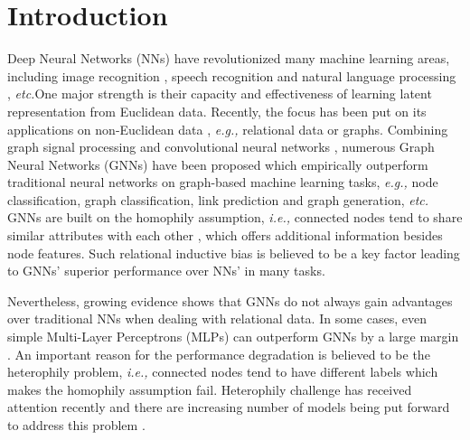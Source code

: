 \documentclass{article}
\newcommand\ie{\textit{i.e.,}}
\newcommand\eg{\textit{e.g.,}}
\newcommand\etc{\textit{etc.}}
\newcommand{\0}{{\boldsymbol{0}}}
\newcommand{\6}{{\partial}}
\newcommand{\8}{{\infty}}
\newcommand{\4}{{\nabla}}
\begin{document}
\section{Introduction}
\label{sec:introduction}
Deep Neural Networks (NNs) \cite{lecun2015deep} have revolutionized many machine learning areas, including image recognition \cite{krizhevsky2012imagenet}, speech recognition \cite{graves2013speech} and natural language processing \cite{bahdanau2014neural}, \etc  One major strength is their capacity and effectiveness of learning latent representation from Euclidean data. Recently, the focus has been put on its applications on non-Euclidean data \cite{bronstein2016geometric}, \eg{} relational data or graphs. Combining graph signal processing and convolutional neural networks \cite{lecun1998gradient}, numerous Graph Neural Networks (GNNs) \cite{scarselli2008graph,defferrard2016fast,hamilton2017inductive,velivckovic2017attention,kipf2016classification,luan2019break} have been proposed which empirically outperform traditional neural networks on graph-based machine learning tasks, \eg{} node classification, graph classification, link prediction and graph generation, \etc
GNNs are built on the homophily assumption\cite{mcpherson2001birds}, \ie{} connected nodes tend to share similar attributes with each other \cite{hamilton2020graph}, which offers additional information besides node features. Such relational inductive bias \cite{battaglia2018relational} is believed to be a key factor leading to GNNs' superior performance over NNs' in many tasks. 

Nevertheless, growing evidence shows that GNNs do not always gain advantages over traditional NNs when dealing with relational data. In some cases, even simple Multi-Layer Perceptrons (MLPs) can outperform GNNs by a large margin \cite{zhu2020beyond,liu2020non,chien2021adaptive}. An important reason for the performance degradation is believed to be the heterophily problem, \ie{} connected nodes tend to have different labels which makes the homophily assumption fail. Heterophily challenge has received attention recently and there are increasing number of models being put forward to address this problem  \cite{zhu2020beyond,liu2020non,chien2021adaptive,zhu2020graph,yan2021two}.  
\end{document}
